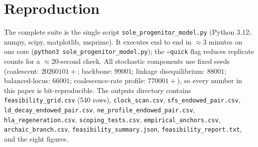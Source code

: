\section{Reproduction}\label{app:repro}
The complete suite is the single script
\texttt{sole\_progenitor\_model.py} (Python 3.12; numpy, scipy,
matplotlib, msprime). It executes end to end in $\approx 3$ minutes on
one core (\texttt{python3 sole\_progenitor\_model.py}); the
\texttt{--quick} flag reduces replicate counts for a $\approx$20-second
check. All stochastic components use fixed seeds (coalescent:
$20260101+$; backbone: $99001$; linkage disequilibrium: $88001$;
balanced-locus: $66001$; coalescence-rate profile: $770001+$), so every
number in this paper is bit-reproducible. The
outputs directory contains
\texttt{feasibility\_grid.csv} (540 rows), \texttt{clock\_scan.csv},
\texttt{sfs\_endowed\_pair.csv}, \texttt{ld\_decay\_endowed\_pair.csv},
\texttt{ne\_profile\_endowed\_pair.csv},
\texttt{hla\_regeneration.csv}, \texttt{scoping\_tests.csv},
\texttt{empirical\_anchors.csv}, \texttt{archaic\_branch.csv},
\texttt{feasibility\_summary.json},
\texttt{feasibility\_report.txt}, and the eight figures.
